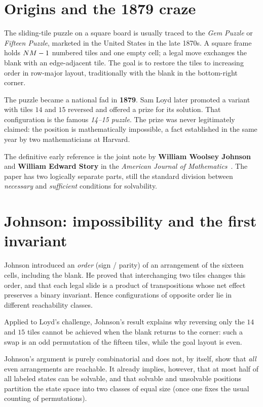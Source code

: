 
\section{Origins and the 1879 craze}\label{sec:origins}

The sliding-tile puzzle on a square board is usually traced to the \emph{Gem Puzzle} or \emph{Fifteen Puzzle}, marketed in the United States in the late 1870s.
A square frame holds $NM-1$ numbered tiles and one empty cell; a legal move exchanges the blank with an edge-adjacent tile.
The goal is to restore the tiles to increasing order in row-major layout, traditionally with the blank in the bottom-right corner.

The puzzle became a national fad in \textbf{1879}.
Sam Loyd later promoted a variant with tiles $14$ and $15$ reversed and offered a prize for its solution.
That configuration is the famous \emph{14--15 puzzle}.
The prize was never legitimately claimed: the position is mathematically impossible, a fact established in the same year by two mathematicians at Harvard.

The definitive early reference is the joint note by \textbf{William Woolsey Johnson} and \textbf{William Edward Story} in the \emph{American Journal of Mathematics}~\cite{JohnsonStory1879}.
The paper has two logically separate parts, still the standard division between \emph{necessary} and \emph{sufficient} conditions for solvability.

\section{Johnson: impossibility and the first invariant}\label{sec:johnson}

Johnson introduced an \emph{order} (sign / parity) of an arrangement of the sixteen cells, including the blank.
He proved that interchanging two tiles changes this order, and that each legal slide is a product of transpositions whose net effect preserves a binary invariant.
Hence configurations of opposite order lie in different reachability classes.

Applied to Loyd's challenge, Johnson's result explains why reversing only the $14$ and $15$ tiles cannot be achieved when the blank returns to the corner: such a swap is an odd permutation of the fifteen tiles, while the goal layout is even.

Johnson's argument is purely combinatorial and does not, by itself, show that \emph{all} even arrangements are reachable.
It already implies, however, that at most half of all labeled states can be solvable, and that solvable and unsolvable positions partition the state space into two classes of equal size (once one fixes the usual counting of permutations).


